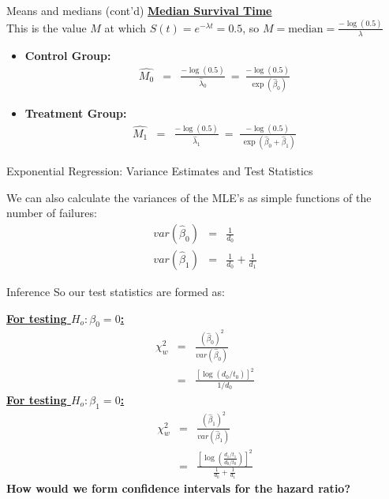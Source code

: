 \documentclass[envcountsect, 10pt, portrait, palatino]{beamer}
\begin{document}
\begin{frame}{Means and medians (cont'd)}
\underline{\bf Median Survival Time}\\[1ex]
This is the value $M$ at which $S(t)=e^{-\lambda t}=0.5$,
so $M = \mbox{median} = \frac{-\log(0.5)}{\lambda}$
\begin{itemize}
\item {\bf Control Group:}
\begin{eqnarray*}
\hat{M_0} & = & \frac{-\log(0.5)}{\hat\lambda_0} ~=~
 \frac{-\log(0.5)}{~\exp(\hat\beta_0)}
\end{eqnarray*}

\item {\bf Treatment Group:}
\begin{eqnarray*}
\hat{M_1} & = & \frac{-\log(0.5)}{\hat\lambda_1} ~=~
 \frac{-\log(0.5)}{~\exp(\hat\beta_0 + \hat\beta_1)}
\end{eqnarray*}
\end{itemize}
\end{frame} 
\begin{frame}{Exponential Regression: Variance Estimates and Test Statistics}

We can also calculate the variances of the MLE's as simple
functions of the number of failures:
\begin{eqnarray*}
var(\hat\beta_0) & = & \frac{1}{d_0}\\[2ex]
var(\hat\beta_1) & = & \frac{1}{d_0} + \frac{1}{d_1}
\end{eqnarray*}
\end{frame} 
\begin{frame}{Inference}
So our test statistics are formed as:

\underline{\bf For testing $H_o: \beta_0=0$:}
\vspace*{-1em}
\begin{eqnarray*}
\chi^2_w & = & \frac{\left(\hat\beta_0\right)^2}{var(\hat\beta_0)}\\
         & = & \frac{[\log(d_0/t_0)]^2}{1/d_0}
\end{eqnarray*}
\underline{\bf For testing $H_o: \beta_1=0$:}
\begin{eqnarray*}
\chi^2_w & = & \frac{\left(\hat\beta_1\right)^2}{var(\hat\beta_1)}\\
         & = & \frac{\left[\log(\frac{d_1/t_1}{d_0/t_0})\right]^2}
{\frac{1}{d_0} + \frac{1}{d_1}}
\end{eqnarray*}
{\bf How would we form confidence intervals for the hazard ratio?}
\end{frame}
\end{document}
